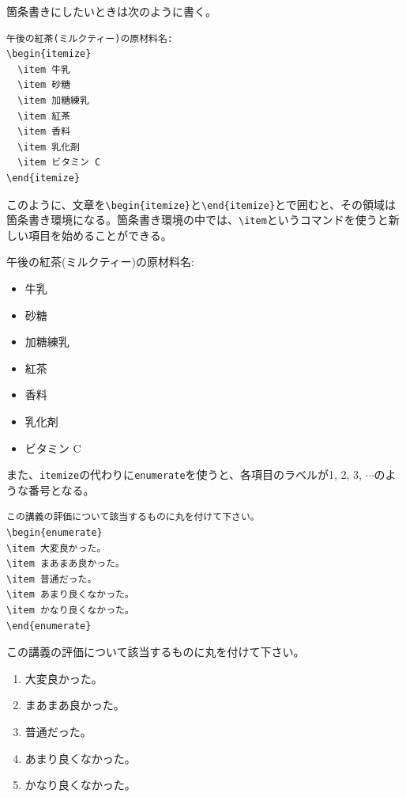 箇条書きにしたいときは次のように書く。
\begin{reidai}
\begin{verbatim}
午後の紅茶(ミルクティー)の原材料名:
\begin{itemize}
  \item 牛乳
  \item 砂糖
  \item 加糖練乳
  \item 紅茶
  \item 香料
  \item 乳化剤
  \item ビタミン C
\end{itemize}
\end{verbatim}
\end{reidai} \noindent
このように、文章を\verb|\begin{itemize}|と\verb|\end{itemize}|とで囲むと、その領域は箇条書き環境になる。箇条書き環境の中では、\verb|\item|というコマンドを使うと新しい項目を始めることができる。
\begin{kekka}
  \def\labelitemisave{\labelitemi}
  \def\labelitemi{$\bullet$}
  午後の紅茶(ミルクティー)の原材料名:
  \begin{itemize}
  \item 牛乳
  \item 砂糖
  \item 加糖練乳
  \item 紅茶
  \item 香料
  \item 乳化剤
  \item ビタミン C
  \end{itemize}
  \def\labelitemi{\labelitemisave}
\end{kekka} \noindent
また、\texttt{itemize}の代わりに\texttt{enumerate}を使うと、各項目のラベルが1, 2, 3, $\cdots$のような番号となる。
\begin{reidai}
\begin{verbatim}
この講義の評価について該当するものに丸を付けて下さい。
\begin{enumerate}
\item 大変良かった。
\item まあまあ良かった。
\item 普通だった。
\item あまり良くなかった。
\item かなり良くなかった。
\end{enumerate}
\end{verbatim}
\end{reidai}
\vspace*{-1.5em}
\begin{kekka}
  この講義の評価について該当するものに丸を付けて下さい。
  \begin{enumerate}
  \item 大変良かった。
  \item まあまあ良かった。
  \item 普通だった。
  \item あまり良くなかった。
  \item かなり良くなかった。
  \end{enumerate}
\end{kekka}



